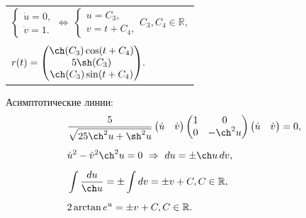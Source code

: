 \documentclass[12pt,a4paper]{article}
\begin{document}
    \begin{table}[h]
        \centering
        \begin{tabular}{l}
            $
                \begin{cases}
                    \dot u = 0,
                    \\
                    \dot v = 1.
                \end{cases}
                \Leftrightarrow\ 
                \begin{cases}
                    u = C_3,
                    \\
                    v = t + C_4,
                \end{cases}
                C_3, C_4 \in \mathbb{R},
            $
            \\ \\
            $
                r(t) =
                    \begin{pmatrix}
                        \ch(C_3) \cos(t + C_4)
                        \\
                        5\sh(C_3)
                        \\
                        \ch(C_3) \sin(t + C_4)
                    \end{pmatrix}\! .
            $
        \end{tabular}
    \end{table}

    Асимптотические линии:
    \[
        \begin{split}
            & \dfrac{5}{\sqrt{25\ch^2 u + \sh^2 u}}
            \begin{pmatrix}
                \dot u & \dot v
            \end{pmatrix}
            \begin{pmatrix}
                1 & 0
                \\
                0 & -\ch^2 u
            \end{pmatrix}
            \begin{pmatrix}
                \dot u & \dot v
            \end{pmatrix} = 0,
            \\[0.5em]
            & \dot u^2 - \dot v^2 \ch^2 u = 0
            \ \Rightarrow \ 
            du = \pm  \ch u \, dv,
            \\[0.5em]
            &  \displaystyle\int{}{\dfrac{du}{\ch u}} = \pm \int{}{dv} = \pm v + C, C \in \mathbb{R},
            \\[0.5em]
            & 2\arctan e^u = \pm v + C, C \in \mathbb{R}.
        \end{split}
    \]
\end{document}
